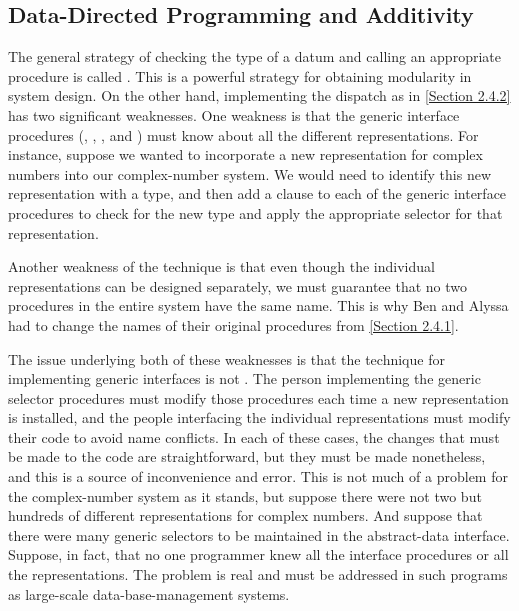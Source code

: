 \subsection{Data-Directed Programming and Additivity}
\label{Section 2.4.3}

The general strategy of checking the type of a datum and calling an appropriate procedure is called .
This is a powerful strategy for obtaining modularity in system design.
On the other hand, implementing the dispatch as in \cref{Section 2.4.2} has two significant weaknesses.
One weakness is that the generic interface procedures (, , , and ) must know about all the different representations.
For instance, suppose we wanted to incorporate a new representation for complex numbers into our complex-number system.
We would need to identify this new representation with a type, and then add a clause to each of the generic interface procedures to check for the new type and apply the appropriate selector for that representation.

Another weakness of the technique is that even though the individual representations can be designed separately, we must guarantee that no two procedures in the entire system have the same name.
This is why Ben and Alyssa had to change the names of their original procedures from \cref{Section 2.4.1}.

The issue underlying both of these weaknesses is that the technique for implementing generic interfaces is not .
The person implementing the generic selector procedures must modify those procedures each time a new representation is installed, and the people interfacing the individual representations must modify their code to avoid name conflicts.
In each of these cases, the changes that must be made to the code are straightforward, but they must be made nonetheless, and this is a source of inconvenience and error.
This is not much of a problem for the complex-number system as it stands, but suppose there were not two but hundreds of different representations for complex numbers.
And suppose that there were many generic selectors to be maintained in the abstract-data interface.
Suppose, in fact, that no one programmer knew all the interface procedures or all the representations.
The problem is real and must be addressed in such programs as large-scale data-base-management systems.

